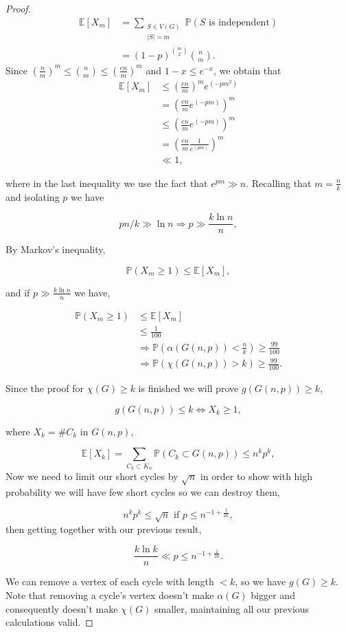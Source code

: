 \documentclass[12pt,twoside,a4paper]{book}
\numberwithin{equation}{section}
\let\log=\ln
\theoremstyle{remark}
\begin{document}
\begin{proof}
\begin{align*}
\mathbb{E}[X_m]&=\sum_{\substack{S \in V(G) \\ |S| = m}} \mathbb{P}(S\text{ is independent})\\
&=(1-p)^{\binom{m}{2}} \binom{n}{m}.
\end{align*}
Since  $\left(\frac{n}{m}\right)^m \leq \binom{n}{m} \leq \left(\frac{en}{m}\right)^m$ and $1-x \leq e^{-x}$, we obtain that
\begin{align*}
\mathbb{E}[X_m] &\leq \left(\frac{en}{m}\right)^m  e^{(-pm^2)} \\
&= \left(\frac{en}{m} e^{(-pm)}\right)^m\\
&\leq \left(\frac{en}{m} e^{(-pm)}\right)^m \\
&= \left(\frac{en}{m}\frac{1}{e^{(pm)}}\right)^m  \\
&\ll 1 ,
\end{align*}

where in the last inequality we use the fact that $e^{pm} \gg n$. Recalling that $m =\frac{n}{k}$ and isolating $p$ we have

$$ pn/k \gg \log n \Rightarrow p \gg \frac{k\log n}{n},$$
 
 By Markov's inequality,
 
 $$ \mathbb{P}(X_m \geq 1) \leq \mathbb{E}[X_m] ,$$
 
and if $p \gg \frac{k \log n}{n}$ we have,
 
 \begin{align*}
\mathbb{P}(X_m \geq 1) &\leq \mathbb{E}[X_m] \\
&\leq \frac{1}{100}  \\
&\Rightarrow \mathbb{P}\left(\alpha (G(n,p)) < \frac{n}{k}\right) \geq \frac{99}{100}\\ 
&\Rightarrow  \mathbb{P}\left(\chi(G(n,p)) > k \right) \geq \frac{99}{100}.
\end{align*}

Since the proof for $\chi(G) \geq k$ is finished we will prove $g(G(n,p))\geq k$,

$$ g(G(n,p)) \leq k \iff X_k \geq 1,$$


where $X_k = \#  C_k$ in $G(n,p)$,

$$\mathbb{E}[X_k] = \sum_{C_k \subset K_n} \mathbb{P}(C_k \subset G(n,p) ) \leq n^kp^k,$$
Now we need to limit our short cycles by $\sqrt{n}$ in order to show with high probability we will have few short cycles so we can destroy them,

$$n^kp^k \leq \sqrt{n} \text{ if } p \leq n^{-1 + \frac{1}{2k}},$$
then getting together with our previous result,

$$\frac{k\log k}{n} \ll p \leq n^{-1 + \frac{1}{2k}}.$$

We can remove a vertex of each cycle with length $<k$, so we have $g(G) \geq k$. Note that removing a cycle's vertex doesn't make $\alpha(G)$ bigger and consequently doesn't make $\chi(G)$ smaller, maintaining all our previous calculations valid.
\end{proof}
\end{document}
